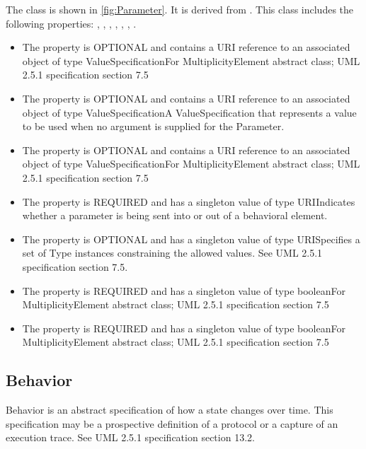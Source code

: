 %
The  class is shown in \ref{fig:Parameter}. It is derived from .%
This class includes the following properties: , , , , , , . %
\begin{itemize}%
\item%
The  property is OPTIONAL and contains a URI reference to an associated object of type ValueSpecificationFor MultiplicityElement abstract class; UML 2.5.1 specification section 7.5%
\item%
The  property is OPTIONAL and contains a URI reference to an associated object of type ValueSpecificationA ValueSpecification that represents a value to be used when no argument is supplied for the Parameter.%
\item%
The  property is OPTIONAL and contains a URI reference to an associated object of type ValueSpecificationFor MultiplicityElement abstract class; UML 2.5.1 specification section 7.5%
\item%
The  property is REQUIRED and has a singleton value of type URIIndicates whether a parameter is being sent into or out of a behavioral element.%
\item%
The  property is OPTIONAL and has a singleton value of type URISpecifies a set of Type instances constraining the allowed values. See UML 2.5.1 specification section 7.5.%
\item%
The  property is REQUIRED and has a singleton value of type booleanFor MultiplicityElement abstract class; UML 2.5.1 specification section 7.5%
\item%
The  property is REQUIRED and has a singleton value of type booleanFor MultiplicityElement abstract class; UML 2.5.1 specification section 7.5%
\end{itemize}%
\subsection{Behavior}%
\label{sec:uml:Behavior}%
Behavior is an abstract specification of how a state changes over time. This specification may be a prospective definition of a protocol or a capture of an execution trace. See UML 2.5.1 specification section 13.2.%
\newline%
\linebreak%


